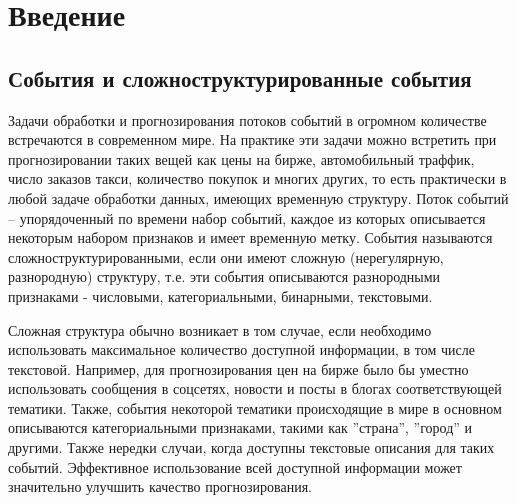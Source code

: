 \section{Введение}
\label{sec:intro} 

\subsection{События и сложноструктурированные события} \label{sect:complex_struct_event}
Задачи обработки и прогнозирования потоков событий в огромном количестве встречаются в современном мире. На практике эти задачи можно встретить при прогнозировании таких вещей как цены на бирже, автомобильный траффик, число заказов такси, количество покупок и многих других, то есть практически в любой задаче обработки данных, имеющих временн\textit{у}ю структуру. Поток событий -- упорядоченный по времени набор событий, каждое из которых описывается некоторым набором признаков и имеет временн\textit{у}ю метку. События называются сложноструктурированными, если они имеют сложную (нерегулярную, разнородную) структуру, т.е. эти события описываются  разнородными признаками - числовыми, категориальными, бинарными,  текстовыми. 

Сложная структура обычно возникает в том случае, если необходимо использовать максимальное количество доступной информации, в том числе текстовой. Например, для прогнозирования цен на бирже было бы уместно использовать сообщения в соцсетях, новости и посты в блогах соответствующей тематики. Также, события некоторой тематики происходящие в мире в основном описываются категориальными признаками, такими как ''страна'', ''город'' и другими. Также нередки случаи, когда доступны текстовые описания для таких событий. Эффективное использование всей доступной информации может значительно улучшить качество прогнозирования.

